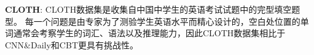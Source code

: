 \textbf{CLOTH}: \quad CLOTH数据集是收集自中国中学生的英语考试试题中的完型填空题型。
每一个问题是由专家为了测验学生英语水平而精心设计的，空白处位置的单词通常会考察学生的词汇、语法以及推理能力，因此CLOTH数据集相比于CNN\&Daily和CBT更具有挑战性。

%

